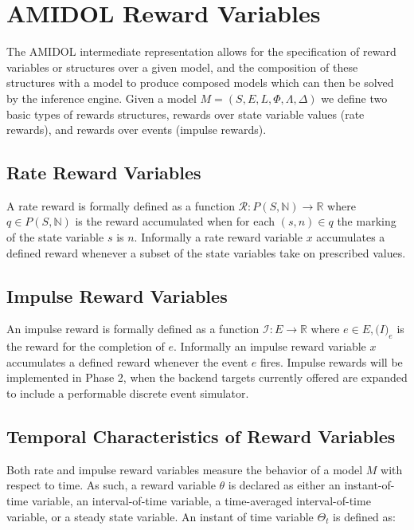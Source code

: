 \documentclass[11pt]{article}
\newcommand{\amidol}{\textsc{AMIDOL}}
\begin{document}
\section{\amidol{} Reward Variables}

The \amidol{} intermediate representation allows for the specification of reward variables or structures over a given model, and the composition of these structures with a model to produce composed models which can then be solved by the inference engine.  Given a model $M = (S, E, L, \Phi, \Lambda, \Delta)$ we define two basic types of rewards structures, rewards over state variable values (rate rewards), and rewards over events (impulse rewards). \cite{qureshi1996algorithms,deavours1999efficient,ciardo1996well,sanders1991reduced}

\subsection{Rate Reward Variables}

A rate reward is formally defined as a function $\mathcal{R}: P(S, \mathbb{N}) \rightarrow \mathbb{R}$ where $q \in P(S, \mathbb{N})$ is the reward accumulated when for each $(s,n) \in q$ the marking of the state variable $s$ is $n$.  Informally a rate reward variable $x$ accumulates a defined reward whenever a subset of the state variables take on prescribed values.

\subsection{Impulse Reward Variables}

An impulse reward is formally defined as a function $\mathcal{I}: E \rightarrow \mathbb{R}$ where $e \in E, \mathcal(I)_e$ is the reward for the completion of $e$.  Informally an impulse reward variable $x$ accumulates a defined reward whenever the event $e$ fires. Impulse rewards will be implemented in Phase 2, when the backend targets currently offered are expanded to include a performable discrete event simulator.

\subsection{Temporal Characteristics of Reward Variables}

Both rate and impulse reward variables measure the behavior of a model $M$ with respect to time.  As such, a reward variable $\theta$ is declared as either an instant-of-time variable, an interval-of-time variable, a time-averaged interval-of-time variable, or a steady state variable.  An instant of time variable $\Theta_t$ is defined as:
\end{document}
